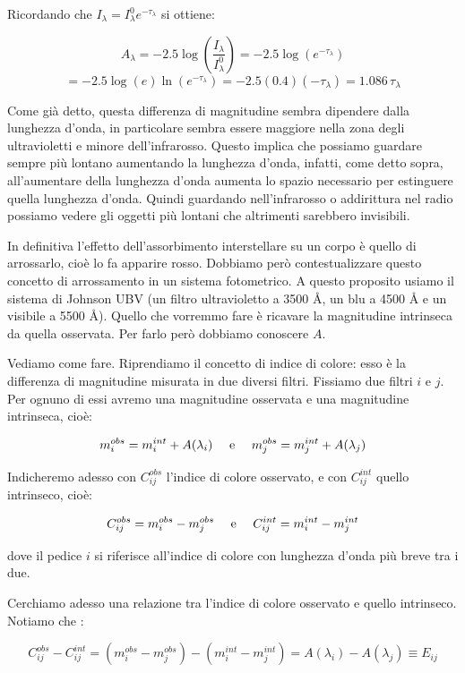 Ricordando che $ I_{\lambda} = I_{\lambda}^0 e^{-\tau_{\lambda}}$ si ottiene:

$$A_{\lambda}=-2.5 \log \left(\frac{I_{\lambda}}{I_{\lambda}^0 } \right)
=-2.5 \log \left( e^{-\tau_{\lambda}} \right)$$
$$=-2.5 \log(e) \ln ( e^{-\tau_{\lambda}} )
=-2.5 (0.4) (-\tau_{\lambda} )
=1.086 \, \tau_{\lambda}$$

Come già detto, questa differenza di magnitudine sembra dipendere dalla lunghezza d'onda, in particolare sembra essere maggiore nella zona degli ultravioletti e minore dell'infrarosso. Questo implica che possiamo guardare sempre più lontano aumentando la lunghezza d'onda, infatti, come detto sopra, all'aumentare della lunghezza d'onda aumenta lo spazio necessario per estinguere quella lunghezza d'onda. Quindi guardando nell'infrarosso o addirittura nel radio possiamo vedere gli oggetti più lontani che altrimenti sarebbero invisibili.

In definitiva l'effetto dell'assorbimento interstellare su un corpo è quello di arrossarlo, cioè lo fa apparire rosso. Dobbiamo però contestualizzare questo concetto di arrossamento in un sistema fotometrico. A questo proposito usiamo il sistema di Johnson UBV (un filtro ultravioletto a 3500 Å, un blu a 4500 Å e un visibile a 5500 Å). Quello che vorremmo fare è ricavare la magnitudine intrinseca da quella osservata. Per farlo però dobbiamo conoscere $A$.

Vediamo come fare. Riprendiamo il concetto di indice di colore: esso è la differenza di magnitudine misurata in due diversi filtri. Fissiamo due filtri $i$ e $j$. Per ognuno di essi avremo una magnitudine osservata e una magnitudine intrinseca, cioè:

$$m_i^{obs} = m_i^{int} + A(\lambda_i) \quad\hbox{ e } \quad m_j^{obs} = m_j^{int} + A(\lambda_j)$$

Indicheremo adesso con $C_{ij}^{obs}$ l'indice di colore osservato, e con $C_{ij}^{int}$ quello intrinseco, cioè:

$$C_{ij}^{obs} = m_i^{obs} - m_j^{obs} \quad\hbox{ e } \quad C_{ij}^{int} = m_i^{int} - m_j^{int}$$

dove il pedice $i$ si riferisce all'indice di colore con lunghezza d'onda più breve tra i due.

Cerchiamo adesso una relazione tra l'indice di colore osservato e quello intrinseco. Notiamo che :

$$C_{ij}^{obs} - C_{ij}^{int} = ( m_i^{obs} - m_j^{obs}) - ( m_i^{int} - m_j^{int} ) = A(\lambda_i) - A(\lambda_j) \equiv E_{ij}$$

